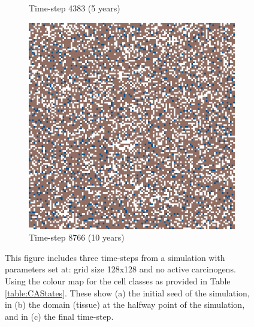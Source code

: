 \documentclass[\main/thesis.tex]{subfiles}
\begin{document}
\begin{figure}[H]
\begin{subfigure}[t]{.3\textwidth}
        \caption{Time-step 4383 (5 years)}
        \label{fig:EquilibriumHalwayPoint}
    \end{subfigure}
    \hfill
    \begin{subfigure}[t]{.3\textwidth}
        \centering
        \includegraphics[width=\textwidth]{images/1_Equilibrium/Fig2/3_last_time_step.jpeg}
        \caption{Time-step 8766 (10 years)}
        \label{fig:EquilibriumFinalTimeStep}
    \end{subfigure}
    \caption{This figure includes three time-steps from a simulation with parameters set at: grid size 128x128 and no active carcinogens. Using the colour map for the cell classes as provided in Table \ref{table:CAStates}. These show (a) the initial seed of the simulation, in (b) the domain (tissue) at the halfway point of the simulation, and in (c) the final time-step.}
    \label{fig:EquilibriumTimeSteps}
\end{figure}
\end{document}
